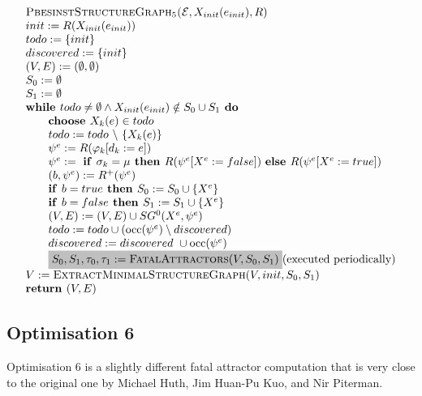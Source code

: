 \documentclass{article}
\newcommand{\Space}{\text{\ }}
\newcommand{\If}{\text{\textbf{if }}}
\newcommand{\Do}{\text{\textbf{ do }}}
\newcommand{\Then}{\text{\textbf{ then }}}
\newcommand{\Else}{\text{\textbf{else }}}
\newcommand{\While}{\text{\textbf{while }}}
\newcommand{\Choose}{\text{\textbf{choose }}}
\newcommand{\Return}{\text{\textbf{return }}}
\begin{document}
\begin{equation*}
\begin{array}{l}
\textsc{PbesinstStructureGraph$_{5}$(}\mathcal{E}, X_{init}(e_{init}), R) \\ 
init:=R(X_{init}(e_{init})) \\
todo:=\{init\} \\
discovered:=\{init\} \\
(V,E) :=(\emptyset ,\emptyset ) \\ 
S_0:= \emptyset \\
S_1:= \emptyset \\
\While todo \neq \emptyset \wedge X_{init}(e_{init}) \notin S_0 \cup S_1 \Do \\ 
\qquad \Choose X_{k}(e)\in todo \\ 
\qquad todo:=todo\ \backslash \ \{X_{k}(e)\} \\ 
\qquad \psi ^{e}:=R(\varphi _{k}[d_{k}:=e]) \\ 
\qquad \psi^e := \Space \If \sigma_k = \mu \Then R(\psi^e[X^e := false])
\Space \Else R(\psi^e[X^e := true]) \\
\qquad (b,\psi^e) := R^+(\psi^e) \\
\qquad \If b = true \Then S_0 := S_0 \cup \{ X^e \} \\
\qquad \If b = false \Then S_1 := S_1 \cup \{ X^e \} \\
\qquad (V,E) := (V,E) \cup SG^{0}(X^{e},\psi ^{e}) \\ 
\qquad todo:=todo\cup (\mathrm{occ}(\psi ^{e})\setminus discovered) \\
\qquad discovered:=discovered\ \cup \mathrm{occ}(\psi ^{e}) \\
\qquad \colorbox{lightgray}{$%
S_0, S_1,\tau_0,\tau_1 := \text{\textsc{FatalAttractors}}(V, S_0, S_1) $} \text{(executed periodically)} \\
V := \textsc{ExtractMinimalStructureGraph}(V, init, S_0, S_1) \\
\Return (V, E)
\end{array}%
\end{equation*}%

\subsection{Optimisation 6}
Optimisation 6 is a slightly different fatal attractor computation that is very close to the
original one by Michael Huth, Jim Huan-Pu Kuo, and Nir Piterman.
\end{document}

